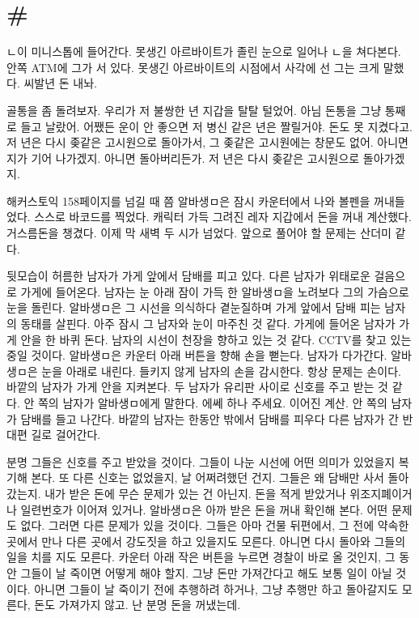 \documentclass[a5paper,10pt, twoside, openright]{memoir}
\begin{document}
	\section{\#}
	ㄴ이 미니스톱에 들어간다. 못생긴 아르바이트가 졸린 눈으로 일어나 ㄴ을 쳐다본다. 안쪽 ATM에 그가 서 있다. 못생긴 아르바이트의 시점에서 사각에 선 그는 크게 말했다. 씨발년 돈 내놔. 

	골통을 좀 돌려보자. 우리가 저 불쌍한 년 지갑을 탈탈 털었어. 아님 돈통을 그냥 통째로 들고 날랐어. 어쨌든 운이 안 좋으면 저 병신 같은 년은 짤릴거야. 돈도 못 지켰다고. 저 년은 다시 좆같은 고시원으로 돌아가서, 그 좆같은 고시원에는 창문도 없어. 아니면 지가 기어 나가겠지. 아니면 돌아버리든가. 저 년은 다시 좆같은 고시원으로 돌아가겠지.

	해커스토익 158페이지를 넘길 때 쯤 알바생ㅁ은 잠시 카운터에서 나와 볼펜을 꺼내들었다. 스스로 바코드를 찍었다. 캐릭터 가득 그려진 레자 지갑에서 돈을 꺼내 계산했다. 거스름돈을 챙겼다. 이제 막 새벽 두 시가 넘었다. 앞으로 풀어야 할 문제는 산더미 같다. 

	뒷모습이 허름한 남자가 가게 앞에서 담배를 피고 있다. 다른 남자가 위태로운 걸음으로 가게에 들어온다. 남자는 눈 아래 잠이 가득 한 알바생ㅁ을 노려보다 그의 가슴으로 눈을 돌린다. 알바생ㅁ은 그 시선을 의식하다 곁눈질하며 가게 앞에서 담배 피는 남자의 동태를 살핀다. 아주 잠시 그 남자와 눈이 마주친 것 같다. 가게에 들어온 남자가 가게 안을 한 바퀴 돈다. 남자의 시선이 천장을 향하고 있는 것 같다. CCTV를 찾고 있는 중일 것이다. 알바생ㅁ은 카운터 아래 버튼을 향해 손을 뻗는다. 남자가 다가간다. 알바생ㅁ은 눈을 아래로 내린다. 들키지 않게 남자의 손을 감시한다. 항상 문제는 손이다. 바깥의 남자가 가게 안을 지켜본다. 두 남자가 유리판 사이로 신호를 주고 받는 것 같다. 안 쪽의 남자가 알바생ㅁ에게 말한다. 에쎄 하나 주세요. 이어진 계산. 안 쪽의 남자가 담배를 들고 나간다. 바깥의 남자는 한동안 밖에서 담배를 피우다 다른 남자가 간 반대편 길로 걸어간다. 

	분명 그들은 신호를 주고 받았을 것이다. 그들이 나눈 시선에 어떤 의미가 있었을지 복기해 본다. 또 다른 신호는 없었을지, 날 어쩌려했던 건지. 그들은 왜 담배만 사서 돌아갔는지. 내가 받은 돈에 무슨 문제가 있는 건 아닌지. 돈을 적게 받았거나 위조지폐이거나 일련번호가 이어져 있거나. 알바생ㅁ은 아까 받은 돈을 꺼내 확인해 본다. 어떤 문제도 없다. 그러면 다른 문제가 있을 것이다. 그들은 아마 건물 뒤편에서, 그 전에 약속한 곳에서 만나 다른 곳에서 강도짓을 하고 있을지도 모른다. 아니면 다시 돌아와 그들의 일을 치를 지도 모른다. 카운터 아래 작은 버튼을 누르면 경찰이 바로 올 것인지, 그 동안 그들이 날 죽이면 어떻게 해야 할지. 그냥 돈만 가져간다고 해도 보통 일이 아닐 것이다. 아니면 그들이 날 죽이기 전에 추행하려 하거나, 그냥 추행만 하고 돌아갈지도 모른다, 돈도 가져가지 않고. 난 분명 돈을 꺼냈는데.
\end{document}
